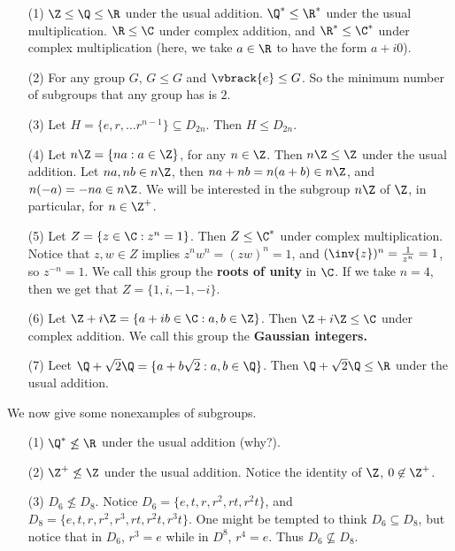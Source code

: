 \begin{example}
    \begin{enumerate}
        \item[(1)] $\Z \leq \Q \leq \R$ under the usual addition.  $\Q^*
            \leq \R^*$ under the usual multiplication. $\R \leq \C$ under
            complex addition, and $\R^* \leq \C^*$ under complex multiplication
            (here, we take $a \in \R$ to have the form  $a+i0$).

        \item[(2)] For any group $G$,  $G \leq G$ and  $\vbrack{e} \leq G$. So
            the minimum number of subgroups that any group has is $2$.

        \item [(3)] Let $H=\{e, r, \dots r^{n-1}\} \subseteq D_{2n}$. Then $H \leq
            D_{2n}$.

        \item[(4)] Let $n\Z=\{na : a \in \Z\}$, for any $n \in \Z$. Then
            $n\Z \leq \Z$ under the usual addition. Let  $na, nb \in n\Z$, then
            $na+nb=n(a+b) \in n\Z$, and $n(-a)=-na \in n\Z$. We will be
            interested in the subgroup $n\Z$ of $\Z$, in particular, for  $n \in
            \Z^+$.

        \item [(5)] Let $Z=\{z \in \C : z^n=1\}$. Then $Z \leq \C^*$ under
            complex multiplication. Notice that  $z,w \in Z$ implies
            $z^nw^n=(zw)^n=1$, and $(\inv{z})^n=\frac{1}{z^n}=1$, so $z^{-n}=1$.
            We call this group the \textbf{roots of unity} in $\C$. If we take
            $n=4$, then we get that  $Z=\{1,i,-1,-i\}$.

        \item[(6)] Let $\Z+i\Z=\{a+ib \in \C : a,b \in \Z\}$. Then $\Z+i\Z \leq
            \C$ under complex addition. We call this group the \textbf{Gaussian
            integers.}

        \item[(7)] Leet $\Q+\sqrt{2}\Q=\{a+b\sqrt{2} : a,b \in \Q\}$. Then
            $\Q+\sqrt{2}\Q \leq \R$ under the usual addition.
    \end{enumerate}
\end{example}

We now give some nonexamples of subgroups.

\begin{example}
    \begin{enumerate}
        \item[(1)] $\Q^* \not\leq \R$ under the usual addition  (why?).

        \item[(2)] $\Z^+ \not\leq \Z$ under the usual addition. Notice the
            identity of $\Z$, $0 \not\in \Z^+$.

        \item[(3)] $D_6 \not\leq D_8$. Notice
            $D_6=\{e,t,r,r^2,rt,r^2t\}$, and $D_8=\{e,t,r,r^2,r^3,rt,r^2t,
            r^3t\}$. One might be tempted to think $D_6 \subseteq D_8$, but
            notice that in $D_6$, $r^3=e$ while in  $D^8$,  $r^4=e$. Thus  $D_6
            \not\subseteq D_8$.
    \end{enumerate}
\end{example}
